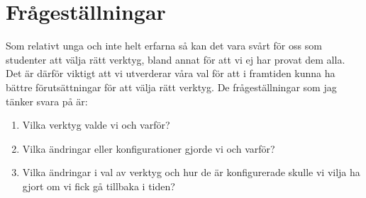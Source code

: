
\section{Frågeställningar}
\label{sec:research-questions}

Som relativt unga och inte helt erfarna så kan det vara svårt för oss som studenter att välja rätt verktyg, bland annat för att vi ej har provat dem alla. Det är därför viktigt att vi utverderar våra val för att i framtiden kunna ha bättre förutsättningar för att välja rätt verktyg. De frågeställningar som jag tänker svara på är:



\begin{enumerate}
\item Vilka verktyg valde vi och varför?
\item Vilka ändringar eller konfigurationer gjorde vi och varför?
\item Vilka ändringar i val av verktyg och hur de är konfigurerade skulle vi vilja ha gjort om vi fick gå tillbaka i tiden?
\end{enumerate}




